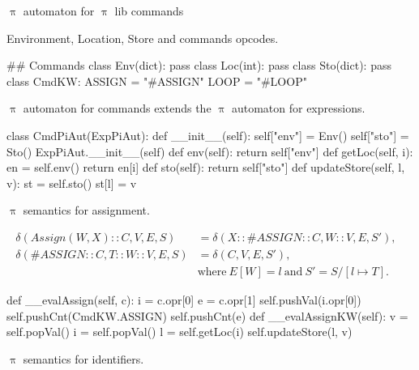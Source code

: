 \documentclass{beamer}
\begin{document}
\begin{frame}{{\color{red}$\uppi$ automaton} for {\color{red}$\uppi$ lib} commands}

Environment, Location, Store and commands opcodes.

\begin{python}
## Commands
class Env(dict): pass
class Loc(int): pass
class Sto(dict): pass
class CmdKW:
    ASSIGN = "#ASSIGN"
    LOOP = "#LOOP"
\end{python}

\framebreak

{\color{red}$\uppi$ automaton} for commands extends the {\color{red}$\uppi$ automaton}  for expressions.

\begin{python}    
class CmdPiAut(ExpPiAut): 
    def __init__(self):    
        self["env"] = Env()
        self["sto"] = Sto()
        ExpPiAut.__init__(self)
    def env(self):
        return self["env"]
    def getLoc(self, i):
        en = self.env()
        return en[i]
    def sto(self):
        return self["sto"]
    def updateStore(self, l, v):
        st = self.sto()
        st[l] = v
\end{python}

\framebreak
        
{\color{red}$\uppi$}  semantics for assignment.

\begin{scriptsize}
\begin{align}
\delta(Assign(W, X) :: C, V, E, S) & = \delta(X :: \#ASSIGN :: C, W :: V, E, S'), \nonumber \\
\delta(\#ASSIGN :: C, T :: W :: V, E, S) & = \delta(C, V, E, S'), & \nonumber \\ & \text{where}~ E[W] = l ~\text{and}~ S' = S/[l \mapsto T]. \nonumber
\end{align}
\end{scriptsize}

\begin{python}
    def __evalAssign(self, c): 
        i = c.opr[0]
        e = c.opr[1]
        self.pushVal(i.opr[0])
        self.pushCnt(CmdKW.ASSIGN)
        self.pushCnt(e)
    def __evalAssignKW(self):
        v = self.popVal()
        i = self.popVal()
        l = self.getLoc(i)
        self.updateStore(l, v) 
\end{python}

\framebreak

{\color{red}$\uppi$}  semantics for identifiers.
        

\end{frame}
\end{document}
